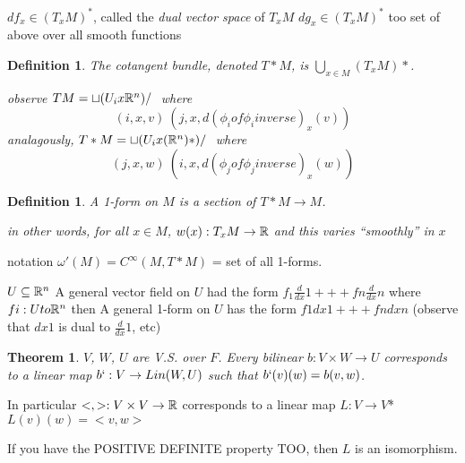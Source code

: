 \documentclass[11pt,leqno,oneside]{amsart}
\newenvironment{dateenv}{
	\vspace{1em}
}{
	\vspace{1em}
}
\newcommand{\x}{\times}
\newcommand{\de}{\emph}
\newcommand{\mydate}[4]{
	\newdate{#1}{#2}{#3}{#4}
	\begin{dateenv}
		\hfill\displaydate{#1}
	\end{dateenv}
}
\theoremstyle{mystyle} \newtheorem{thrm}[thm]{Theorem}
\theoremstyle{mystyle} \newtheorem{defi}[thm]{Definition}
\begin{document}
$df_x \in (T_xM)^*$, called the \de{dual vector space} of $T_xM$
$dg_x \in (T_xM)^*$ too
set of above over all smooth functions

\begin{defi}
	The \de{cotangent bundle}, denoted $T*M$, is
	$\bigcup_{x \in M} (T_xM)*$.


	observe
	$TM = \sqcup (U_i x {\mathbb R}^n)/~$
	where $$(i, x, v) ~ (j, x, d(\phi_i of \phi_i inverse)_x(v))$$
	analagously,
	$T*M = \sqcup (U_i x ({\mathbb R}^n)*)/~$
	where $$(j, x, w) ~ (i, x, d(\phi_j of \phi_j inverse)_x(w))$$
\end{defi}
\begin{defi}
	A \de{1-form} on $M$ is a section of $T*M \to M$.

	in other words, for all $x \in M$, $w(x): T_xM \to {\mathbb R}$ and this varies ``smoothly'' in $x$
\end{defi}
	notation
	$\omega'(M) = C^\infty(M, T*M)$ = set of all 1-forms.

\begin{example}
	$U \subseteq {\mathbb R}^n$
	A general vector field on $U$ had the form
	$f_1 \frac{d}{dx}1 +++ fn \frac{d}{dx}n$
	where $fi : U to {\mathbb R}^n$
	then
	A general 1-form on $U$ has the form
	$f1 dx1 +++ fn dxn$
	(observe that $dx1$ is dual to $\frac{d}{dx}1$, etc)
\end{example}

\mydate{d7}{17}{10}{2016}

\begin{thrm}
	$V$, $W$, $U$ are V.S. over $F$.  Every bilinear $b:V \x W \to U$ corresponds to a linear map $b` : V \to Lin(W,U)$
	such that $b`(v)(w) = b(v,w)$.
\end{thrm}
	In particular $<,> : V \x V \to \R$
	corresponds to a linear map
	$L: V \to V$*
	$L(v)(w) = <v,w>$

	If you have the POSITIVE DEFINITE property TOO, then $L$ is an isomorphism.
\end{document}
